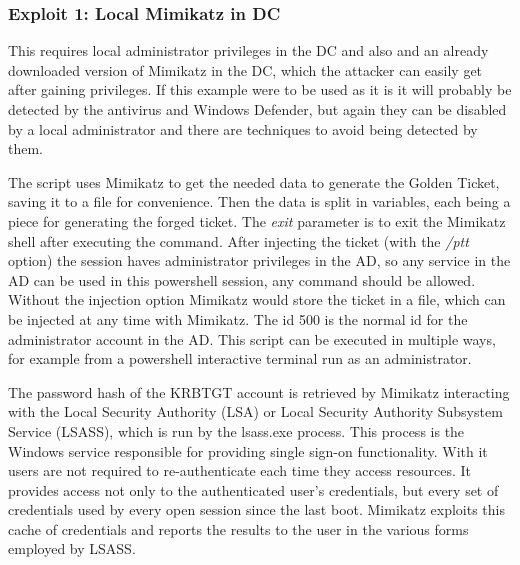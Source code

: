 \subsubsection{Exploit 1: Local Mimikatz in DC}
This requires local administrator privileges in the DC and also and an already downloaded version of Mimikatz in the DC, which the attacker can easily get after gaining privileges. If this example were to be used as it is it will probably be detected by the antivirus and Windows Defender, but again they can be disabled by a local administrator and there are techniques to avoid being detected by them.
\linej

\linej
The script uses Mimikatz to get the needed data to generate the Golden Ticket, saving it to a file for convenience. Then the data is split in variables, each being a piece for generating the forged ticket. The \textit{exit} parameter is to exit the Mimikatz shell after executing the command.
\linej
After injecting the ticket (with the \textit{/ptt} option) the session haves administrator privileges in the AD, so any service in the AD can be used in this powershell session, any command should be allowed. Without the injection option Mimikatz would store the ticket in a file, which can be injected at any time with Mimikatz.
The id 500 is the normal id for the administrator account in the AD.
This script can be executed in multiple ways, for example from a powershell interactive terminal run as an administrator.
\linej

\linej
The password hash of the KRBTGT account is retrieved by Mimikatz interacting with the Local Security Authority (LSA) or Local Security Authority Subsystem Service (LSASS), which is run by the lsass.exe process.
\linej
This process is the Windows service responsible for providing single sign-on functionality.
With it users are not required to re-authenticate each time they access resources.
It provides access not only to the authenticated user's credentials, but every set of credentials used by every open session since the last boot\cite{wikipedia_lsass}\cite{dump_ways}.
\linej
Mimikatz exploits this cache of credentials and reports the results to the user in the various forms employed by LSASS\cite{SANS_mimikatz}\cite{pentestlab}.

